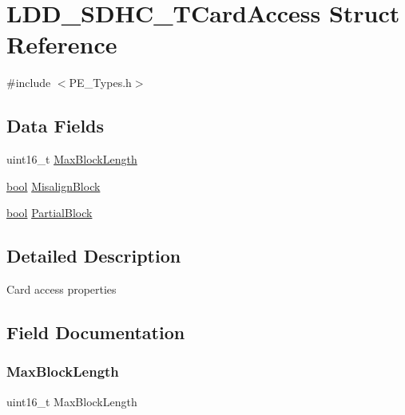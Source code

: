\hypertarget{struct_l_d_d___s_d_h_c___t_card_access}{}\section{L\+D\+D\+\_\+\+S\+D\+H\+C\+\_\+\+T\+Card\+Access Struct Reference}
\label{struct_l_d_d___s_d_h_c___t_card_access}


{\ttfamily \#include $<$P\+E\+\_\+\+Types.\+h$>$}

\subsection*{Data Fields}
\begin{DoxyCompactItemize}
\item 
uint16\+\_\+t \hyperlink{struct_l_d_d___s_d_h_c___t_card_access_a63d197a2620879d09830ae7137a3ab76}{Max\+Block\+Length}
\item 
\hyperlink{group___p_e___types__module_ga97a80ca1602ebf2303258971a2c938e2}{bool} \hyperlink{struct_l_d_d___s_d_h_c___t_card_access_a5b08187d657371000fc5fa5881c5035e}{Misalign\+Block}
\item 
\hyperlink{group___p_e___types__module_ga97a80ca1602ebf2303258971a2c938e2}{bool} \hyperlink{struct_l_d_d___s_d_h_c___t_card_access_a47b8a92a3af829fc1cfec79e6b30ba63}{Partial\+Block}
\end{DoxyCompactItemize}


\subsection{Detailed Description}
Card access properties 

\subsection{Field Documentation}
\mbox{\label{struct_l_d_d___s_d_h_c___t_card_access_a63d197a2620879d09830ae7137a3ab76}} 
\subsubsection{\texorpdfstring{Max\+Block\+Length}{MaxBlockLength}}
{\footnotesize\ttfamily uint16\+\_\+t Max\+Block\+Length}

